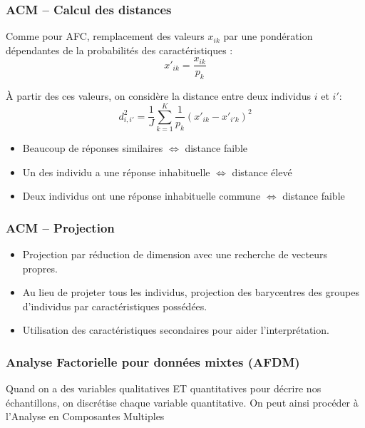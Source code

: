 \begin{frame}
  \frametitle{ACM -- Calcul des distances}

  Comme pour AFC, remplacement des valeurs $x_{ik}$ par une pondération dépendantes de la probabilités des caractéristiques :
  \begin{equation*}
    x'_{ik}=\frac{x_{ik}}{p_k}
  \end{equation*}

  À partir des ces valeurs, on considère la distance entre deux individus $i$ et $i'$:
  \begin{equation*}
    d_{i,i'}^2=\frac{1}{J}\sum^K_{k=1} \frac{1}{p_k}(x'_{ik}-x'_{i'k})^2
  \end{equation*}

  \begin{itemize}
    \item Beaucoup de réponses similaires $\Leftrightarrow$ distance faible
    \item Un des individu a une réponse inhabituelle $\Leftrightarrow$ distance élevé
    \item Deux individus ont une réponse inhabituelle commune $\Leftrightarrow$ distance faible
  \end{itemize}
\end{frame}

\begin{frame}
  \frametitle{ACM -- Projection}
  \begin{itemize}
    \item Projection par réduction de dimension avec une recherche de vecteurs propres. 
    \item Au lieu de projeter tous les individus, projection des barycentres des groupes d'individus par caractéristiques possédées. 
    \item Utilisation des caractéristiques secondaires pour aider l'interprétation.
  \end{itemize}
  
  

\end{frame}

\begin{frame}
  \frametitle{Analyse Factorielle pour données mixtes (AFDM)}
  Quand on a des variables qualitatives ET quantitatives pour décrire nos échantillons, on discrétise chaque variable quantitative. On peut ainsi procéder à l'Analyse en Composantes Multiples
\end{frame}

